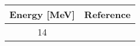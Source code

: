 \begin{tabular}{c c} 
    \toprule 
    \bf{Energy [MeV]} & \bf{Reference} \\
    \midrule
    14 & \cite{Haas63}\\
    \bottomrule
\end{tabular}
